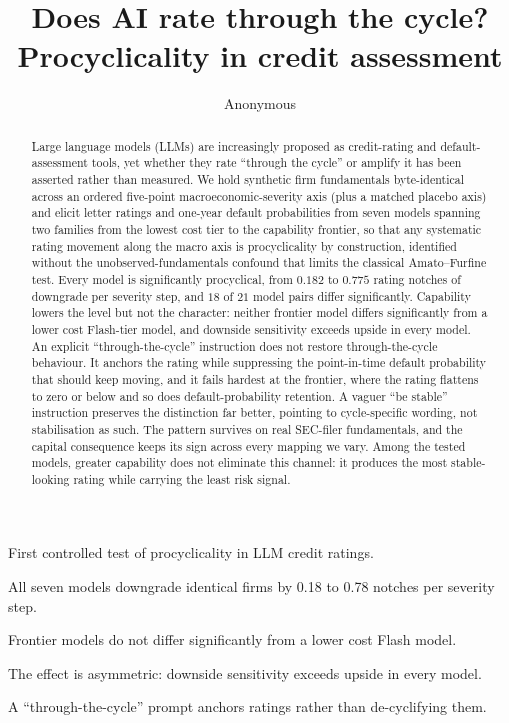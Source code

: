 \documentclass[a4paper,fleqn]{cas-sc}
\begin{document}
\let\WriteBookmarks\relax
\def\floatpagepagefraction{1}
\def\textpagefraction{.001}

\shortauthors{}

\title[mode=title]{Does AI rate through the cycle? Procyclicality in credit assessment}

\author[1]{Anonymous}

\begin{abstract}
Large language models (LLMs) are increasingly proposed as credit-rating and default-assessment
tools, yet whether they rate ``through the cycle'' or amplify it has been asserted rather than
measured. We hold
synthetic firm fundamentals byte-identical across an ordered five-point macroeconomic-severity axis
(plus a matched placebo axis) and elicit letter ratings and one-year default
probabilities from seven models spanning two families from the lowest cost tier to the capability
frontier, so that any systematic rating movement along the macro axis is procyclicality by construction, identified without the
unobserved-fundamentals confound that limits the classical Amato--Furfine test. Every model is
significantly procyclical, from $0.182$ to $0.775$ rating notches of downgrade per severity step, and
$18$ of $21$ model pairs differ significantly. Capability lowers the level but not the character: neither
frontier model differs significantly from a lower cost Flash-tier model, and downside
sensitivity exceeds upside in every model. An explicit ``through-the-cycle'' instruction
does not restore through-the-cycle behaviour. It anchors the rating while suppressing the
point-in-time default probability that should keep moving, and it fails hardest at the frontier, where
the rating flattens to zero or below and so does default-probability retention. A vaguer
``be stable'' instruction preserves the distinction far better, pointing to cycle-specific wording, not
stabilisation as such. The pattern survives on real SEC-filer fundamentals, and the
capital consequence keeps its sign across every mapping we vary. Among the tested models,
greater capability does not eliminate this channel: it produces the most stable-looking rating while carrying
the least risk signal.
\end{abstract}

\begin{highlights}
\item First controlled test of procyclicality in LLM credit ratings.
\item All seven models downgrade identical firms by 0.18 to 0.78 notches per severity step.
\item Frontier models do not differ significantly from a lower cost Flash model.
\item The effect is asymmetric: downside sensitivity exceeds upside in every model.
\item A ``through-the-cycle'' prompt anchors ratings rather than de-cyclifying them.
\end{highlights}
\end{document}
